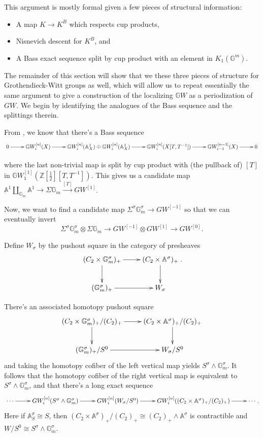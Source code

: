 \documentclass[edeposit,fullpage]{uiucthesis2009}
\newcommand{\Z}{\mathbb Z}
\newcommand{\mbb}{\mathbb}
\theoremstyle{plain}
\numberwithin{lemma}{section}
\theoremstyle{definition}
\begin{document}
This argument is mostly formal given a few pieces of structural
information:
\begin{itemize}
\item A map $K \rightarrow K^B$ which respects cup
  products,
\item Nisnevich descent for $K^B$, and
\item A Bass exact sequence split by cup product with an element in
  $K_1(\mbb G^m)$.
\end{itemize}

The remainder of this section will show that we these three pieces of structure
for Grothendieck-Witt groups as well, which will allow us to repeat
essentially the same argument to give a construction of the localizing
$\mbb GW$ as a periodization of $GW$. We begin by
identifying the analogues of the Bass sequence and the splittings
therein.

From \cite[Theorem 9.13]{Schder}, we know that there's a Bass sequence
\[
\xymatrix{0 \ar[r] & \mbb GW^{[n]}_i(X) \ar[r] & \mbb GW^{[n]}_i(\mbb
  A^1_X) \oplus \mbb GW^{[n]}_i(\mbb A^1_X) \ar[r] & \mbb
  GW^{[n]}_i(X[T,T^{-1}]) \ar[r] & \mbb GW^{[n-1]}_{i-1}(X) \ar[r] & 0}
\]

where the last non-trivial map is split by cup product with (the
pullback of) $[T]$ in $\mbb
GW_1^{[1]}(\Z[\frac{1}{2}][T,T^{-1}])$. This gives us a candidate map
$\mbb A^1 \coprod_{\mbb G_m} \mbb A^1 \rightarrow \Sigma \mbb G_m \xrightarrow{[T]} GW^{[1]}$. 

Now, we want to find a candidate map $\Sigma^\sigma \mbb G_m^\sigma
\rightarrow GW^{[-1]}$ so that we can eventually invert 
\[
\Sigma^\sigma
\mbb G_m^\sigma \otimes \Sigma \mbb G_m \rightarrow GW^{[-1]} \otimes
GW^{[1]} \rightarrow GW^{[0]}.
\]

Define $W_\sigma$ by the pushout square in
the category of presheaves
\[
\xymatrix{(C_2 \times \mbb G_m^\sigma)_+ \ar[r]\ar[d] & (C_2 \times \mbb
  A^\sigma)_+ \ar[d] \\ (\mbb G_m^\sigma)_+ \ar[r] & W_\sigma}.
\]

There's an associated homotopy pushout square
\[
\xymatrix{(C_2 \times \mbb G_m^\sigma)_+/(C_2)_+ \ar[r]\ar[d] & (C_2 \times \mbb
  A^\sigma)_+/(C_2)_+ \ar[d] \\ (\mbb G_m^\sigma)_+/S^0 \ar[r] & W_\sigma/S^0}
\]
and taking the homotopy cofiber of the left vertical map yields
$S^\sigma \wedge \mbb G_m^\sigma$. It follows that the homotopy cofiber
of the right vertical map is equivalent to  $S^\sigma \wedge \mbb
G_m^\sigma$, and that there's a long exact sequence
\begin{equation}\label{eq:bass_inv}
\xymatrix{\cdots \ar[r] & GW_i^{[n]}(S^\sigma \wedge \mbb G_m^\sigma) \ar[r] &
  GW_i^{[n]}(W_\sigma/S^0) \ar[r] & GW_i^{[n]}((C_2 \times \mbb
  A^\sigma)_+/(C_2)_+) \ar[r] & \cdots }.
\end{equation}
Here if $\mbb A^\sigma_S \cong S$, then $(C_2 \times \mbb
  A^\sigma)_+/(C_2)_+ \cong (C_2)_+ \wedge \mbb A^\sigma$ is
  contractible and $W/S^0 \cong S^\sigma \wedge \mbb G_m^\sigma$. 
\end{document}
